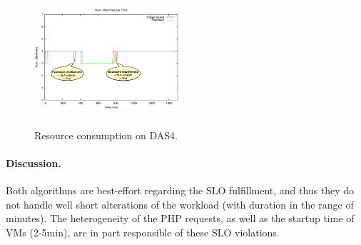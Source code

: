 \begin{figure}
\begin{center}
\includegraphics[width=0.49\textwidth, height=5cm]{./images/homogeneous/explain_DAS4_Provisioning}
\end{center}
\vspace{-5mm}
\caption{Resource consumption on DAS4.}
\label{resComDas4}
\end{figure}

\paragraph{Discussion.}




Both algorithms are best-effort regarding the SLO fulfillment, and thus they do not handle well short alterations of the workload (with duration in the range of minutes). The heterogeneity of the PHP requests, as well as the startup time of VMs (2-5min), are in part responsible of these SLO violations.

